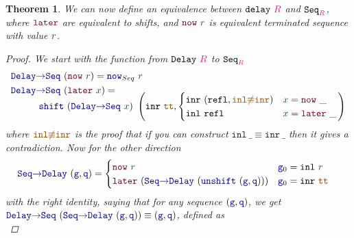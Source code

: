 \documentclass[twoside,11pt,openright]{report}
\theoremstyle{plain} %
\newtheorem{thm}{Theorem}[section]
\theoremstyle{definition}
\theoremstyle{remark}
\newcommand*{\term}[1]{\textcolor{green!30!black}{#1}} %
\newcommand*{\type}[1]{\textcolor{magenta!90!black}{#1}}
\newcommand*{\constant}[1]{\textcolor{orange!60!black}{\ensuremath{\mathtt{#1}}}}
\newcommand*{\function}[1]{\textcolor{blue!60!black}{\ensuremath{\mathtt{#1}}}}
\newcommand*{\constructor}[1]{\textcolor{purple!60!black}{\ensuremath{\mathtt{#1}}}}
\newcommand*{\typeformer}[1]{\ensuremath{\mathtt{#1}}}
\begin{document}
\begin{thm}
  \noindent We can now define an equivalence between \(\typeformer{delay}~\type{R}\) and \(\typeformer{Seq}_{\type{R}}\), where \(\constructor{later}\) are equivalent to shifts, and \(\constructor{now}~\term{r}\) is equivalent terminated sequence with value \(\term{r}\).
  \begin{proof}
    We start with the function from \(\typeformer{Delay}~\type{R}\) to \(\typeformer{Seq}_{\type{R}}\)
    \begin{equation}
      \begin{aligned}
        \function{Delay{\rightarrow}Seq}&~(\constructor{now}~\term{r}) = \function{now}_{Seq}~\term{r} \\
        \function{Delay{\rightarrow}Seq}&~(\constructor{later}~\term{x}) = \\[-3mm]
        & \strut\hspace{-8mm}\function{shift}~(\function{Delay{\rightarrow}Seq}~\term{x})~\left(\mathtt{inr}~\constant{tt} , \begin{cases} \mathtt{inr}~(\mathtt{refl} , \constant{inl{\not\equiv}inr}) & \term{x} = \constructor{now}~\_ \\ \mathtt{inl}~\mathtt{refl} & \term{x} = \constructor{later}~\_ \end{cases}\right)
      \end{aligned}
    \end{equation}
    where \(\constant{inl{\not\equiv}inr}\) is the proof that if you can construct \(\mathtt{inl}~\_ \equiv \mathtt{inr}~\_\) then it gives a contradiction. Now for the other direction
    \begin{equation}
      \begin{aligned}
        \function{Seq{\rightarrow}Delay}&~(\function{g} , \function{q}) = \begin{cases} \constructor{now}~\term{r} & \function{g}_0 = \mathtt{inl}~\term{r} \\ \constructor{later}~(\function{Seq{\rightarrow}Delay}~(\function{unshift}~(\function{g} , \function{q}))) & \function{g}_0 = \mathtt{inr}~\constant{tt} \end{cases}
      \end{aligned}
    \end{equation}
    with the right identity, saying that for any sequence \((\function{g},\function{q})\), we get \(\function{Delay{\rightarrow}Seq}~(\function{Seq{\rightarrow}Delay}~(\function{g},\function{q})) \equiv (\function{g},\function{q})\), defined as
    \begin{equation}

\end{equation}
\end{proof}
\end{thm}
\end{document}
